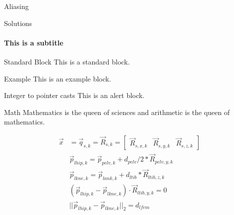 \documentclass[aspectratio=169]{beamer}
\begin{document}
  \begin{frame}{Aliasing}

  \end{frame}

	\begin{frame}{Solutions}
		\framesubtitle{This is a subtitle}
		\begin{block}{Standard Block}
			This is a standard block.
		\end{block}
		
		\begin{exampleblock}{Example}
			This is an example block.
		\end{exampleblock}
		
    \begin{alertblock}{Integer to pointer casts}
			This is an alert block.
		\end{alertblock}
	\end{frame}

	
	\begin{frame}{Math}
		Mathematics is the queen of sciences and arithmetic is the queen of mathematics.

		\begin{align*}
			\vec{x} &= \vec{q}_{s, k} = \vec{R}_{s, k} = 
			\begin{bmatrix}
			\vec{R}_{s, x, k} & \vec{R}_{s, y, k} & \vec{R}_{s, z, k}
			\end{bmatrix} \\
			& \vec{p}_{lhip, k} = \vec{p}_{pelv, k} + d_{pelv}/2*\vec{R}_{pelv, y, k} \\
			& \vec{p}_{lkne, k} = \vec{p}_{lank, k} + d_{ltib}*\vec{R}_{ltib, z, k} \\
			& (\vec{p}_{lhip, k} - \vec{p}_{lkne, k} ) \cdot \vec{R}_{ltib, y, k} = 0\\
			& ||\vec{p}_{lhip, k} - \vec{p}_{lkne, k}||_2 = d_{lfem}
		\end{align*}	
		
		
	\end{frame}
\end{document}
